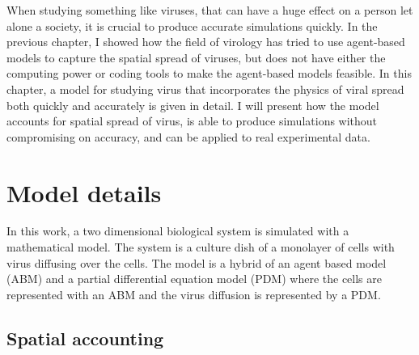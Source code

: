 When studying something like viruses, that can have a huge effect on a person let alone a society, it is crucial to produce accurate simulations quickly. In the previous chapter, I showed how the field of virology has tried to use agent-based models to capture the spatial spread of viruses, but does not have either the computing power or coding tools to make the agent-based models feasible. In this chapter, a model for studying virus that incorporates the physics of viral spread both quickly and accurately is given in detail. I will present how the model accounts for spatial spread of virus, is able to produce simulations without compromising on accuracy, and can be applied to real experimental data. 

\section{Model details}

In this work, a two dimensional biological system is simulated with a mathematical model. The system is a culture dish of a monolayer of cells with virus diffusing over the cells. The model is a hybrid of an agent based model (ABM) and a partial differential equation model (PDM) where the cells are represented with an ABM and the virus diffusion is represented by a PDM.

\subsection{Spatial accounting} \label{Spatial_accounting}

